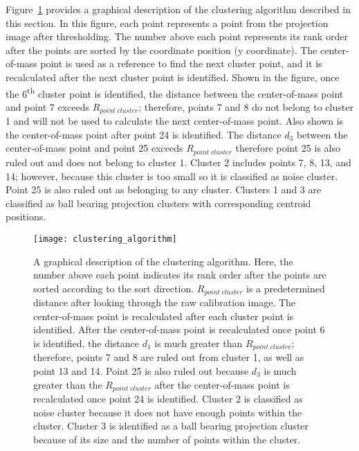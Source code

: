 Figure~\ref{fig:clustering_algorithm} provides a graphical description of the clustering algorithm described in this section.  In this figure, each point represents a point from the projection image after thresholding.  The number above each point represents its rank order after the points are sorted by the coordinate position (y coordinate).  The center-of-mass point is used as a reference to find the next cluster point, and it is recalculated after the next cluster point is identified.  Shown in the figure, once the 6\textsuperscript{th} cluster point is identified, the distance between the center-of-mass point and point 7 exceeds $R_{point \; cluster}$; therefore, points 7 and 8 do not belong to cluster 1 and will not be used to calculate the next center-of-mass point.  Also shown is the center-of-mass point after point 24 is identified. The distance $d_3$ between the center-of-mass point and point 25 exceeds $R_{point \; cluster}$ therefore point 25 is also ruled out and does not belong to cluster 1.  Cluster 2 includes points 7, 8, 13, and 14; however, because this cluster is too small so it is classified as noise cluster.  Point 25 is also ruled out as belonging to any cluster.  Clusters 1 and 3 are classified as ball bearing projection clusters with corresponding centroid positions.
%
\begin{figure}[ht]
\centering
\texttt{[image: clustering\_algorithm]}
\caption{A graphical description of the clustering algorithm.  Here, the number above each point indicates its rank order after the points are sorted according to the sort direction.  $R_{point \; cluster}$ is a predetermined distance after looking through the raw calibration image.  The center-of-mass point is recalculated after each cluster point is identified.  After the center-of-mass point is recalculated once point 6 is identified, the distance $d_1$ is much greater than $R_{point \; cluster}$; therefore, points 7 and 8 are ruled out from cluster 1, as well as point 13 and 14.  Point 25 is also ruled out because $d_3$ is much greater than the $R_{point \; cluster}$ after the center-of-mass point is recalculated once point 24 is identified.  Cluster 2 is classified as noise cluster because it does not have enough points within the cluster.  Cluster 3 is identified as a ball bearing projection cluster because of its size and the number of points within the cluster.}
\label{fig:clustering_algorithm}
\end{figure}


